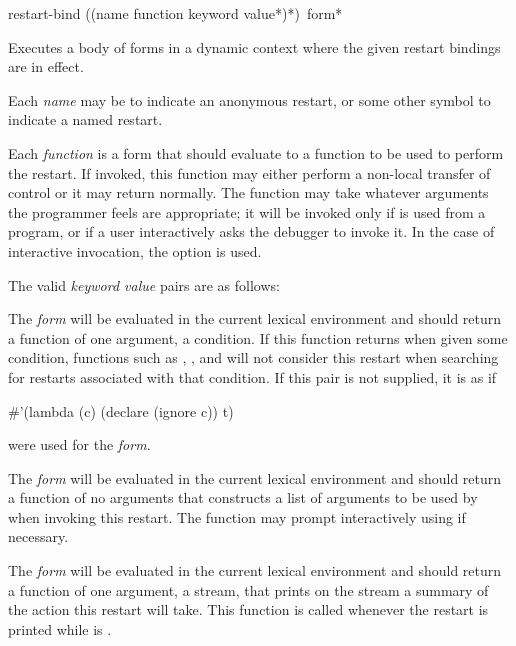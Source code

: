 \begin{defmac}
restart-bind ({(name function {keyword value}*)}*) {\,form}*

  Executes a body of forms in a dynamic context where the given restart
  bindings are in effect.

  Each {\it name} may be  to indicate an anonymous restart, or some other symbol
  to indicate a named restart.

  Each {\it function} is a form that
  should evaluate to a function to be used to perform the restart.
  If invoked, this function may either perform a non-local transfer of control
  or it may return normally. The function may take whatever arguments the
  programmer feels are appropriate; it will be invoked only if 
  is used from a program, or if a user interactively asks the debugger to
  invoke it. In the case of interactive invocation, the 
  option is used.


  The valid {\it keyword value} pairs are as follows:
\begin{flushdesc}
\item[\cd{:test-function {\it form}}]

    The {\it form} will be evaluated in the current lexical environment and
     should return a function of one argument, a condition.
    If this function returns  when given some condition, functions such as
, , and 
will not consider this restart when searching for restarts associated with
that condition.  If this pair is not supplied, it is as if
\begin{lisp}
\#'(lambda (c) (declare (ignore c)) t)
\end{lisp}
were used for the {\it form}.

\item[\cd{:interactive-function {\it form}}]

     The {\it form} will be evaluated in the current lexical environment and
     should return a function of no arguments that constructs a list
     of arguments to be used by  when invoking
     this restart. The function may prompt interactively using 
     if necessary.

\item[\cd{:report-function {\it form}}]

     The {\it form} will be evaluated in the current lexical environment and
     should return a function of one argument, a stream, that prints on
     the stream a summary of the action this restart will take. This
     function is called whenever the restart is printed while 
     is .
\end{flushdesc}
\end{defmac}

